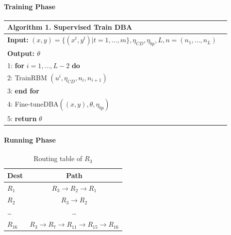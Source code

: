 \documentclass[11pt]{report}
\begin{document}
	\paragraph{Training Phase}
     
	\begin{tabular}{lc}
		\toprule
		\textbf{Algorithm 1}. Supervised Train DBA\\
		\hline
		\textbf{Input:} $\left(x,y\right)=\{\left(x^t,y^t\right)|t=1,...,m\}, \eta_{CD}, \eta_{bp},L, n=\left(n_1,...,n_L\right)$\\
		\textbf{Output: $\theta$}\\
		1: \textbf{for} $i=1,...,L-2$ \textbf{do}\\
		2: \quad TrainRBM $\left(u^i,\eta_{CD},n_i,n_{i+1}\right)$\\
		3: \textbf{end for}\\
		4: Fine-tuneDBA$\left(\left(x,y\right),\theta,\eta_{bp}\right)$\\
		5: \textbf{return} $\theta$\\
		\hline
	\end{tabular}

	\paragraph{Running Phase} 

	
	\begin{table}[!h]
		\centering
		\caption{Routing table of $R_3$}
		\begin{tabular}{lc}
			\toprule
			Dest& Path\\
			\hline
			$R_1$& $R_3 \to R_2 \to R_1$\\
			$R_2$& $R_3 \to R_2$\\
			\dots& \dots\\
			$R_{16}$& $R_3 \to R_7 \to R_{11} \to R_{15} \to R_{16}$\\
			\hline
		\end{tabular}
	\end{table}

	
\end{document}
